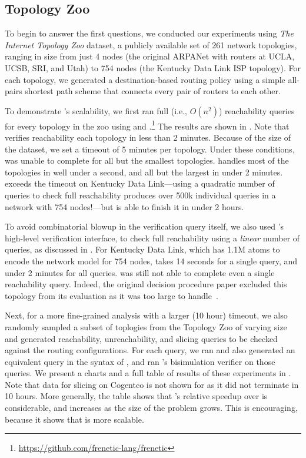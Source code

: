 \documentclass[acmsmall,dvipsnames,nonacm]{acmart}
\begin{document}
\subsection{Topology Zoo}

To begin to answer the first questions, we conducted our experiments
using \emph{The Internet Topology Zoo} \citep{Knight2011} dataset, a
publicly available set of 261 network topologies, ranging in size from
just 4 nodes (the original ARPANet with routers at UCLA, UCSB, SRI,
and Utah) to 754 nodes (the Kentucky Data Link ISP topology).  For
each topology, we generated a destination-based routing policy using a
simple all-pairs shortest path scheme that connects every pair of
routers to each other.

To demonstrate \KATch{}'s scalability, we first ran full (i.e.,
$O(n^2)$) reachability queries for every topology in the zoo using
\KATch{} and
\Frenetic.\footnote{\url{https://github.com/frenetic-lang/frenetic}}
The results are shown in . Note that \KATch{}
verifies reachability each topology in less than 2 minutes. Because of
the size of the dataset, we set a timeout of 5 minutes per
topology. Under these conditions, \Frenetic{} was unable to complete
for all but the smallest topologies. \KATch{} handles most of the
topologies in well under a second, and all but the largest in under 2
minutes. \KATch{} exceeds the timeout on Kentucky Data Link---using a
quadratic number of queries to check full reachability produces over
500k individual queries in a network with 754 nodes!---but is able to
finish it in under 2 hours.

To avoid combinatorial blowup in the verification query itself, we
also used \KATch{}'s high-level verification interface, to check full
reachability using a \emph{linear} number of queries, as discussed in
. For Kentucky Data Link, which has 1.1M
atoms to encode the network model for 754 nodes, \KATch{} takes 14
seconds for a single query, and under 2 minutes for all
queries. \Frenetic{} was still not able to complete even a single
reachability query. Indeed, the original \NetKAT decision procedure
paper excluded this topology from its evaluation as it was too large
to handle~\cite{Foster2015}.

Next, for a more fine-grained analysis with a larger (10 hour) timeout,
we also randomly sampled a
subset of toplogies from the Topology Zoo of varying size and
generated reachability, unreachability, and slicing queries to be
checked against the routing configurations. For each query, we ran
\KATch{} and also generated an equivalent query in the syntax of
\Frenetic, and ran \Frenetic's bisimulation verifier on those queries.
We present a charts and a full table of results of these experiments
in . Note that data for slicing on Cogentco is
not shown for \Frenetic as it did not terminate in 10 hours. More
generally, the table shows that \KATch{}'s relative speedup over
\Frenetic{} is considerable, and increases as the size of the problem
grows. This is encouraging, because it shows that \KATch{} is more
scalable.
\end{document}
